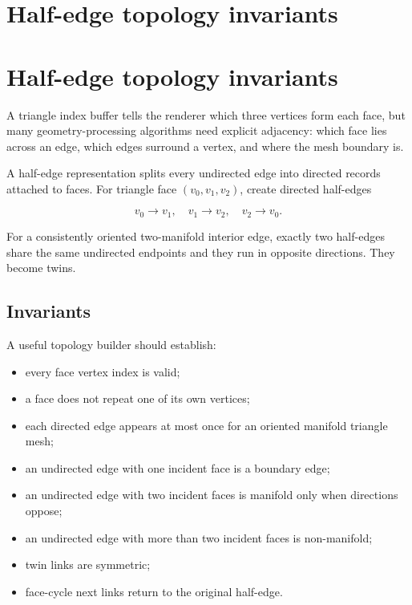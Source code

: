 \hypertarget{appendix-faac749c9cdd}{}
\section*{Half-edge topology invariants}
\section{Half-edge topology invariants}\label{appendix-faac749c9cdd-half-edge-topology-invariants}

A triangle index buffer tells the renderer which three vertices form each face, but many geometry-processing algorithms need explicit adjacency: which face lies across an edge, which edges surround a vertex, and where the mesh boundary is.

A half-edge representation splits every undirected edge into directed records attached to faces. For triangle face \((v_0,v_1,v_2)\), create directed half-edges

\[
v_0\rightarrow v_1,\quad
v_1\rightarrow v_2,\quad
v_2\rightarrow v_0.
\]

For a consistently oriented two-manifold interior edge, exactly two half-edges share the same undirected endpoints and they run in opposite directions. They become twins.

\subsection{Invariants}\label{appendix-faac749c9cdd-invariants}

A useful topology builder should establish:

\begin{itemize}
\tightlist
\item
  every face vertex index is valid;
\item
  a face does not repeat one of its own vertices;
\item
  each directed edge appears at most once for an oriented manifold triangle mesh;
\item
  an undirected edge with one incident face is a boundary edge;
\item
  an undirected edge with two incident faces is manifold only when directions oppose;
\item
  an undirected edge with more than two incident faces is non-manifold;
\item
  twin links are symmetric;
\item
  face-cycle next links return to the original half-edge.
\end{itemize}

